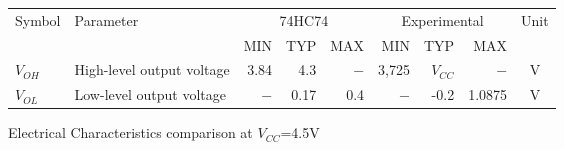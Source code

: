 \begin{tabular}{|l|l|r|r|r|r|r|r|c|}
    \toprule
    Symbol  &Parameter  &\multicolumn{3}{c|}{74HC74}&\multicolumn{3}{c|}{Experimental}&Unit\\
            &           &   MIN&TYP&MAX&MIN&TYP&MAX&\\
    \midrule
    $V_{OH}$&High-level output voltage&3.84&4.3&$-$&3,725&$V_{CC}$&$-$&V\\
    $V_{OL}$&Low-level output voltage &$-$&0.17&0.4&$-$&-0.2&1.0875&V\\
    \bottomrule
\end{tabular}
\caption{Electrical Characteristics comparison at $V_{CC}$=4.5V}